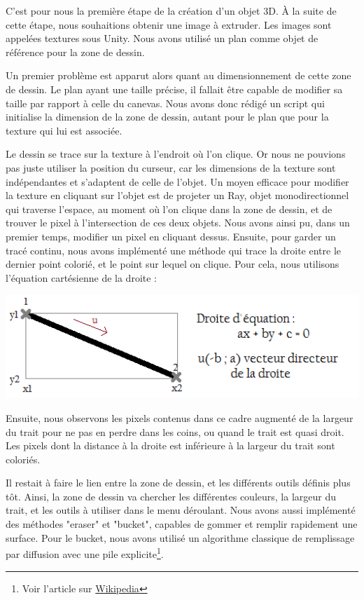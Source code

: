 \documentclass[a4paper,11pt]{article}
\begin{document}
			C'est pour nous la première étape de la création d'un objet 3D. À la suite de cette étape, nous souhaitions obtenir une image à extruder. Les images sont appelées textures sous Unity. Nous avons utilisé un plan comme objet de référence pour la zone de dessin.
			
			Un premier problème est apparut alors quant au dimensionnement de cette zone de dessin. Le plan ayant une taille précise, il fallait être capable de modifier sa taille par rapport à celle du canevas. Nous avons donc rédigé un script qui initialise la dimension de la zone de dessin, autant pour le plan que pour la texture qui lui est associée.
			
			Le dessin se trace sur la texture à l'endroit où l'on clique. Or nous ne pouvions pas juste utiliser la position du curseur, car les dimensions de la texture sont indépendantes et s'adaptent de celle de l'objet. Un moyen efficace pour modifier la texture en cliquant sur l'objet est de projeter un Ray, objet monodirectionnel qui traverse l'espace, au moment où l'on clique dans la zone de dessin, et de trouver le pixel à l'intersection de ces deux objets. Nous avons ainsi pu, dans un premier temps, modifier un pixel en cliquant dessus. Ensuite, pour garder un tracé continu, nous avons implémenté une méthode qui trace la droite entre le dernier point colorié, et le point sur lequel on clique. Pour cela, nous utilisons l'équation cartésienne de la droite :
			\centerline{\includegraphics[scale=0.6]{images/trait.png}}
			Ensuite, nous observons les pixels contenus dans ce cadre augmenté de la largeur du trait pour ne pas en perdre dans les coins, ou quand le trait est quasi droit. Les pixels dont la distance à la droite est inférieure à la largeur du trait sont coloriés.
			
			 Il restait à faire le lien entre la zone de dessin, et les différents outils définis plus tôt. Ainsi, la zone de dessin va chercher les différentes couleurs, la largeur du trait, et les outils à utiliser dans le menu déroulant. Nous avons aussi implémenté des méthodes "eraser" et "bucket", capables de gommer et remplir rapidement une surface. Pour le bucket, nous avons utilisé un algorithme classique de remplissage par diffusion avec une pile explicite\footnote{Voir l'article sur \href{http://fr.wikipedia.org/wiki/Algorithme_de_remplissage_par_diffusion}{Wikipedia}}.
			
\end{document}
